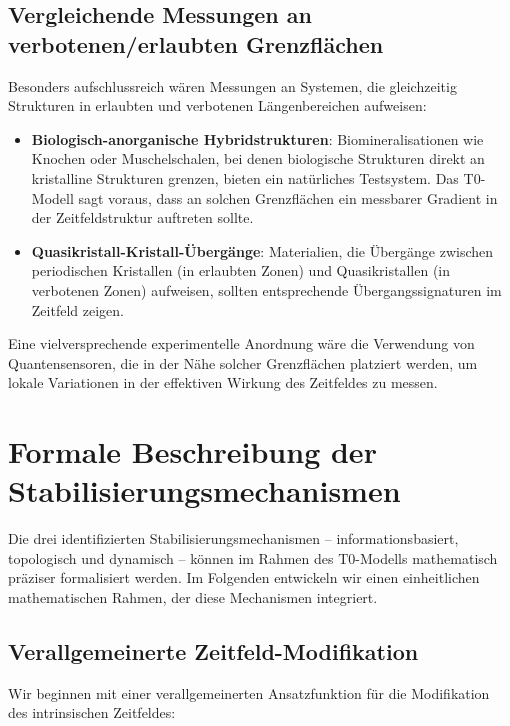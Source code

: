 \documentclass[12pt,a4paper]{article}
\begin{document}
	\subsection{Vergleichende Messungen an verbotenen/erlaubten Grenzflächen}
	\label{subsec:grenzflaechen_messungen}
	
	Besonders aufschlussreich wären Messungen an Systemen, die gleichzeitig Strukturen in erlaubten und verbotenen Längen\-bereichen aufweisen:
	
	\begin{itemize}
		\item \textbf{Biologisch-anorganische Hybridstrukturen}: Biomineralisationen wie Knochen oder Muschelschalen, bei denen biologische Strukturen direkt an kristalline Strukturen grenzen, bieten ein natürliches Testsystem. Das T0-Modell sagt voraus, dass an solchen Grenzflächen ein messbarer Gradient in der Zeitfeldstruktur auftreten sollte.
		
		\item \textbf{Quasikristall-Kristall-Übergänge}: Materialien, die Übergänge zwischen periodischen Kristallen (in erlaubten Zonen) und Quasikristallen (in verbotenen Zonen) aufweisen, sollten entsprechende Übergangssignaturen im Zeitfeld zeigen.
	\end{itemize}
	
	Eine vielversprechende experimentelle Anordnung wäre die Verwendung von Quantensensoren, die in der Nähe solcher Grenzflächen platziert werden, um lokale Variationen in der effektiven Wirkung des Zeitfeldes zu messen.
	
	\section{Formale Beschreibung der Stabilisierungsmechanismen}
	\label{sec:formale_beschreibung}
	
	Die drei identifizierten Stabilisierungs\-mechanismen – informationsbasiert, topologisch und dynamisch – können im Rahmen des T0-Modells mathematisch präziser formalisiert werden. Im Folgenden entwickeln wir einen einheitlichen mathematischen Rahmen, der diese Mechanismen integriert.
	
	\subsection{Verallgemeinerte Zeitfeld-Modifikation}
	\label{subsec:zeitfeld_modifikation}
	
	Wir beginnen mit einer verallgemeinerten Ansatzfunktion für die Modifikation des intrinsischen Zeitfeldes:
	
\end{document}
